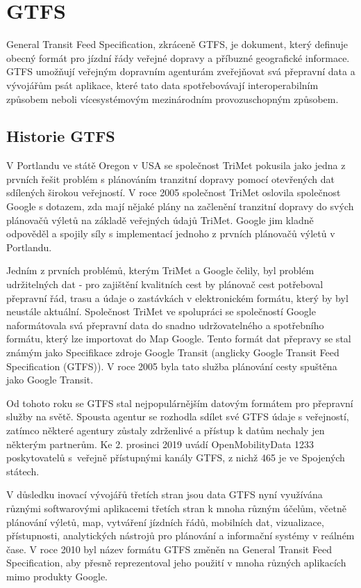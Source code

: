 \chapter{GTFS}
\label{2-teorie-gtfs}

General Transit Feed Specification, zkráceně GTFS, je dokument, který definuje
obecný formát pro jízdní řády veřejné dopravy a příbuzné geografické informace.
GTFS  umožňují veřejným dopravním agenturám zveřejňovat svá přepravní
data a vývojářům psát aplikace, které tato data spotřebovávají interoperabilním
způsobem neboli vícesystémovým mezinárodním provozuschopným způsobem. \cite{gtfs-info}

\section{Historie GTFS}
V Portlandu ve státě Oregon v USA se společnost TriMet pokusila jako jedna z prvních 
řešit problém s plánováním tranzitní dopravy pomocí otevřených dat sdílených širokou veřejností.
V roce 2005 společnost TriMet oslovila společnost Google s dotazem, zda mají nějaké plány
na začlenění tranzitní dopravy do svých plánovačů výletů na základě veřejných údajů TriMet.
Google jim kladně odpověděl a spojily síly s implementací jednoho z prvních plánovačů výletů v Portlandu.

Jedním z prvních problémů, kterým TriMet a Google čelily, byl problém udržitelných dat
- pro zajištění kvalitních cest by plánovač cest potřeboval přepravní řád, 
trasu a údaje o zastávkách v elektronickém formátu, který by byl neustále aktuální. 
Společnost TriMet ve spolupráci se společností Google naformátovala svá přepravní 
data do snadno udržovatelného a spotřebního formátu, který lze importovat do Map Google. 
Tento formát dat přepravy se stal známým jako Specifikace zdroje Google Transit (anglicky
Google Transit Feed Specification (GTFS)). 
V roce 2005 byla tato služba plánování cesty spuštěna jako Google Transit.

Od tohoto roku se GTFS stal nejpopulárnějším datovým formátem pro přepravní služby na světě. 
Spousta agentur se rozhodla sdílet své GTFS údaje s veřejností, zatímco některé agentury 
zůstaly zdrženlivé a přístup k datům nechaly jen některým partnerům. Ke 2. prosinci 2019
uvádí OpenMobilityData 1233 poskytovatelů s~veřejně přístupnými kanály GTFS,
z nichž 465 je ve Spojených státech. 

V důsledku inovací vývojářů třetích stran jsou data GTFS nyní využívána různý\-mi softwarovými aplikacemi
třetích stran k mnoha různým účelům, včetně plánování výletů, map, vytváření jízdních řádů, mobilních dat,
vizualizace, přístupnosti, analytických nástrojů pro plánování a informační systémy v reálném čase.
V roce 2010 byl název formátu GTFS změněn na General Transit Feed Specification,
aby přesně reprezentoval jeho použití v mnoha různých aplikacích mimo produkty Google. \cite{transitwiki} 
 
